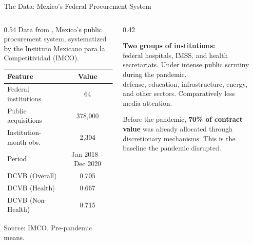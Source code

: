\documentclass[aspectratio=169, 10pt]{beamer}
\begin{document}
\begin{frame}{The Data: Mexico's Federal Procurement System}
  \begin{columns}
    \begin{column}{0.54\textwidth}
      Data from , Mexico's public procurement system,
      systematized by the Instituto Mexicano para la Competitividad (IMCO).

      \vspace{0.6em}
      \begin{center}
      \small
      \begin{tabular}{lc}
        \toprule
        \textbf{Feature} & \textbf{Value} \\
        \midrule
        Federal institutions     & 64 \\
        Public acquisitions      & 378,000 \\
        Institution-month obs.   & 2,304 \\
        Period                   & Jan 2018 -- Dec 2020 \\
        \midrule
        DCVB (Overall)           & 0.705 \\
        DCVB (Health)            & 0.667 \\
        DCVB (Non-Health)        & 0.715 \\
        \bottomrule
      \end{tabular}
      \end{center}

      \vspace{0.4em}
      {\small \color{medgray} Source: IMCO. Pre-pandemic means.}
    \end{column}
    \begin{column}{0.42\textwidth}
      \begin{methodbox}
        \textbf{Two groups of institutions:}\\[0.5em]
         federal hospitals, IMSS, and health
        secretariats. Under intense public scrutiny during the pandemic.\\[0.5em]
         defense, education, infrastructure,
        energy, and other sectors. Comparatively less media attention.
      \end{methodbox}

      \vspace{0.4em}
      {\small \color{medgray}
        Before the pandemic, \textbf{70\% of contract value} was already
        allocated through discretionary mechanisms. This is the baseline
        the pandemic disrupted.}
    \end{column}
  \end{columns}
\end{frame}
\end{document}
